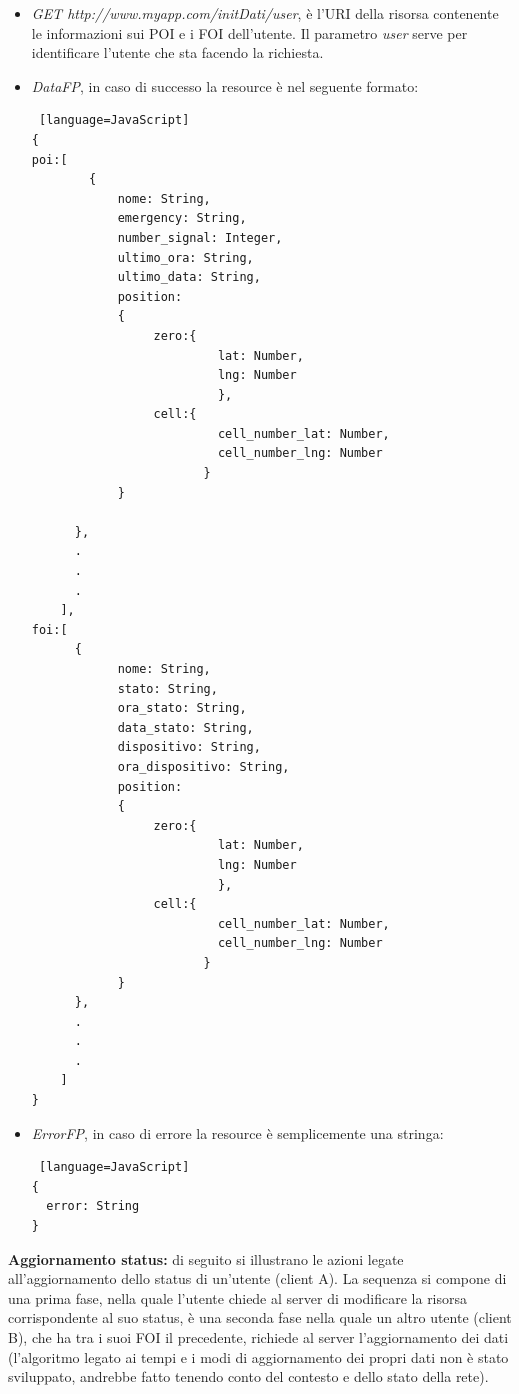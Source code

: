 \begin{itemize}
\item \textit{GET http://www.myapp.com/initDati/user}, è l'URI della risorsa contenente le informazioni sui POI e i FOI dell'utente. Il parametro \textit{user} serve per identificare l'utente che sta facendo la richiesta.
\item \textit{DataFP}, in caso di successo la resource è nel seguente formato:\\
\begin{lstlisting} [language=JavaScript]
{
poi:[
		{
			nome: String,
			emergency: String,
			number_signal: Integer,
			ultimo_ora: String,
			ultimo_data: String,
			position: 
			{
			     zero:{
			              lat: Number,
			              lng: Number
			              },
			     cell:{
			              cell_number_lat: Number,
			              cell_number_lng: Number
			            }
			}
			
	  },
	  .
	  .
	  .
	],
foi:[
	  {
			nome: String,
			stato: String,
			ora_stato: String,
			data_stato: String,
			dispositivo: String,
			ora_dispositivo: String,
			position: 
			{
			     zero:{
			              lat: Number,
			              lng: Number
			              },
			     cell:{
			              cell_number_lat: Number,
			              cell_number_lng: Number
			            }
			}
	  },
	  .
	  .
	  .
	]
}
\end{lstlisting}
\item \textit{ErrorFP}, in caso di errore la resource è semplicemente una stringa:\\
\begin{lstlisting} [language=JavaScript]
{
  error: String
}
\end{lstlisting}
\end{itemize}
\newpage
 \textbf{Aggiornamento status:} di seguito si illustrano le azioni legate all'aggiornamento dello status di un'utente (client A). La sequenza si compone di una prima fase, nella quale l'utente chiede al server di modificare la risorsa corrispondente al suo status, è una seconda fase nella quale un altro utente (client B), che ha tra i suoi FOI il precedente, richiede al server l'aggiornamento dei dati (l'algoritmo legato ai tempi e i modi di aggiornamento dei propri dati non è stato sviluppato, andrebbe fatto tenendo conto del contesto e dello stato della rete).\\
